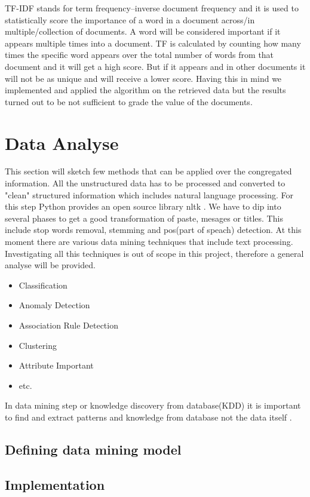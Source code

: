 \documentclass[12pt]{article}
\begin{document}
TF-IDF \cite{tf-idf} stands for term frequency–inverse document frequency and it is used to statistically score the importance of a word in a document across/in multiple/collection of documents. A word will be considered important if it appears multiple times into a document. TF is calculated by counting how many times the specific word appears over the total number of words from that document and it will get a high score. But if it appears and in other documents it will not be as unique and will receive a lower score. Having this in mind we implemented and applied the algorithm  on the retrieved data but the results turned out to be not sufficient to grade the value of the documents.
\section{Data Analyse}
This section will sketch few methods that can be applied over the congregated information. All the unstructured data has to be processed and converted to "clean" structured information which includes natural language processing. For this step Python provides an open source library nltk \cite{nltk}. We have to dip into several phases to get a good transformation of  paste, mesages or titles. This include stop words removal, stemming and pos(part of speach) detection. 
At this moment there are various data mining techniques \cite{oracle-list} that include text processing. Investigating all this techniques is out of scope in this project, therefore a general analyse will be provided. 
\begin{itemize}
\item Classification
\item Anomaly Detection
\item Association Rule Detection
\item Clustering
\item Attribute Important 
\item etc.
\end{itemize}

In data mining step or knowledge discovery from database(KDD) it is important to find and extract patterns and knowledge from database not the data itself \cite{data-kdd}.  
 
\subsection{Defining data mining model}
\subsection{Implementation}
\end{document}
